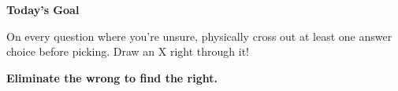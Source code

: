 {\vspace{3mm}

\begin{tcolorbox}[
    enhanced,
    colback=funYellowLight,
    colframe=funYellow!60,
    arc=10pt,
    boxrule=1pt,
    left=6mm, right=6mm, top=4mm, bottom=4mm,
]
{\bfseries\color{funYellowDark} \faLightbulb\hspace{2mm}Today's Goal}

\vspace{2mm}

On every question where you're unsure, physically cross out at least one answer choice before picking. Draw an X right through it!
\end{tcolorbox}

\vspace{4mm}

\begin{center}
{\large\bfseries\color{funPurpleDark} \faGem\hspace{2mm}Eliminate the wrong to find the right.\hspace{2mm}\faGem}
\end{center}

}
\newpage
